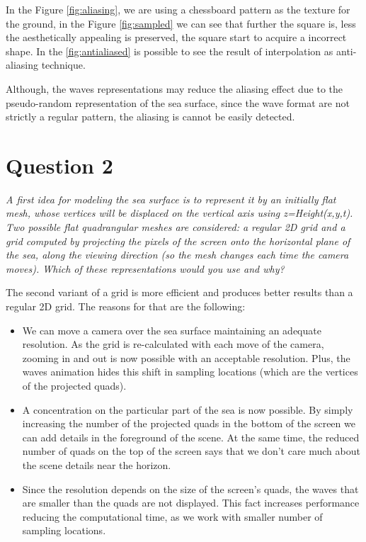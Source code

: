 \documentclass{report}
\begin{document}
In the Figure \ref{fig:aliasing}, we are using a chessboard pattern as the texture for the ground, in the Figure \ref{fig:sampled} we can see that further the square is, less the aesthetically appealing is preserved, the square start to acquire a incorrect shape. In the \ref{fig:antialiased} is possible to see the result of interpolation as anti-aliasing technique.	

Although, the waves representations may reduce the aliasing effect due to the pseudo-random representation of the sea surface, since the wave format are not strictly a regular pattern, the aliasing is cannot be easily detected. 


\section{Question 2}

\emph{A first idea for modeling the sea surface is to represent it by an
initially flat mesh, whose vertices will be displaced on the vertical
axis using z=Height(x,y,t). Two possible flat quadrangular meshes are
considered: a regular 2D grid and a grid computed by projecting the
pixels of the screen onto the horizontal plane of the sea, along the
viewing direction (so the mesh changes each time the camera moves).
Which of these representations would you use and why?}

The second variant of a grid is more efficient and produces better
results than a regular 2D grid. The reasons for that are the following:

\begin{itemize}

  \item We can move a camera over the sea surface maintaining an
    adequate resolution. As the grid is re-calculated with each move of
    the camera, zooming in and out is now possible with an acceptable
    resolution. Plus, the waves animation hides this shift in sampling
    locations (which are the vertices of the projected quads).
    
  \item A concentration on the particular part of the sea is now
    possible. By simply increasing the number of the projected quads in
    the bottom of the screen we can add details in the foreground of the
    scene. At the same time, the reduced number of quads on the top of
    the screen says that we don't care much about the scene details
    near the horizon.
    
  \item Since the resolution depends on the size of the screen's quads,
    the waves that are smaller than the quads are not displayed. This
    fact increases performance reducing the computational time, as we
    work with smaller number of sampling locations.

\end{itemize}
\end{document}
